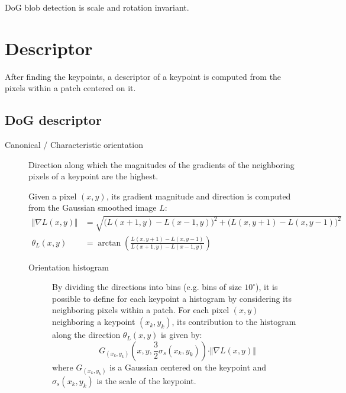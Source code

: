 \begin{remark}
    DoG blob detection is scale and rotation invariant.
\end{remark}



\section{Descriptor}

After finding the keypoints, a descriptor of a keypoint is computed from the pixels within a patch centered on it.


\subsection{DoG descriptor}

\begin{description}
    \item[Canonical / Characteristic orientation] 
        Direction along which the magnitudes of the gradients of the neighboring pixels of a keypoint are the highest.

        Given a pixel $(x, y)$, its gradient magnitude and direction is computed from the Gaussian smoothed image $L$:
        \[ 
            \begin{split}
                \Vert \nabla L(x, y) \Vert &= \sqrt{ \big( L(x+1, y) - L(x-1, y) \big)^2 + \big( L(x, y+1) - L(x, y-1) \big)^2 } \\
                \theta_L(x, y) &= \arctan\left( \frac{L(x, y+1) - L(x, y-1)}{L(x+1, y) - L(x-1, y)} \right)
            \end{split}
        \] 

        \begin{description}
            \item[Orientation histogram] 
                By dividing the directions into bins (e.g. bins of size $10^\circ$),
                it is possible to define for each keypoint a histogram by considering its neighboring pixels within a patch.
                For each pixel $(x, y)$ neighboring a keypoint $(x_k, y_k)$, its contribution to the histogram along the direction $\theta_L(x, y)$ is given by:
                \[ G_{(x_k, y_k)}\left( x, y, \frac{3}{2} \sigma_s(x_k, y_k) \right) \cdot \Vert \nabla L(x, y) \Vert \]
                where $G_{(x_k, y_k)}$ is a Gaussian centered on the keypoint and  $\sigma_s(x_k, y_k)$ is the scale of the keypoint.


\end{description}
\end{description}
